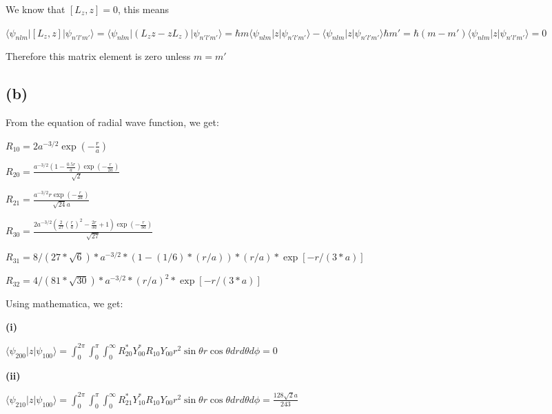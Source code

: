 \documentclass[12pt]{article}
\begin{document}
\begin{spacing}{2.0}
We know that $[L_z,z]=0$, this means

$\langle \psi_{nlm}|[L_z,z]|\psi_{n'l'm'} \rangle = \langle \psi_{nlm}|(L_zz-zL_z)|\psi_{n'l'm'} \rangle = \hbar m\langle \psi_{nlm}|z|\psi_{n'l'm'} \rangle - \langle \psi_{nlm}|z|\psi_{n'l'm'} \rangle \hbar m' = \hbar(m-m')\langle \psi_{nlm}|z|\psi_{n'l'm'} \rangle = 0$

Therefore this matrix element is zero unless $m=m'$

%
%

\subsection*{(b)}

From the equation of radial wave function, we get:

$R_{10}=2 a^{-3/2} \exp \left(-\frac{r}{a}\right)$

$R_{20}= \frac{a^{-3/2} \left(1-\frac{0.5 r}{a}\right) \exp \left(-\frac{r}{2 a}\right)}{\sqrt{2}}$

$R_{21}=\frac{a^{-3/2} r \exp \left(-\frac{r}{2 a}\right)}{\sqrt{24} a}$

$R_{30}=\frac{2 a^{-3/2} \left(\frac{2}{27} \left(\frac{r}{a}\right)^2-\frac{2 r}{3 a}+1\right) \exp \left(-\frac{r}{3 a}\right)}{\sqrt{27}}$

$R_{31}=8/(27*\sqrt{6})*a^{-3/2}*(1 - (1/6)*(r/a))*(r/a)*\exp[-r/(3*a)]$

$R_{32}=4/(81*\sqrt{30})*a^{-3/2}*(r/a)^2*\exp[-r/(3*a)]$

Using mathematica, we get:

\textbf{(i)}

$\langle \psi_{200}|z|\psi_{100} \rangle = \int_{0}^{2\pi} \int_{0}^{\pi} \int_{0}^{\infty} R^{*}_{20}Y^{*}_{00}R_{10}Y_{00} r^2 \sin \theta r \cos \theta dr d\theta d\phi=0$

\textbf{(ii)}

$\langle \psi_{210}|z|\psi_{100} \rangle = \int_{0}^{2\pi} \int_{0}^{\pi} \int_{0}^{\infty} R^{*}_{21}Y^{*}_{10}R_{10}Y_{00} r^2 \sin \theta r \cos \theta dr d\theta d\phi=\frac{128 \sqrt{2} a}{243}$


\end{spacing}
\end{document}
